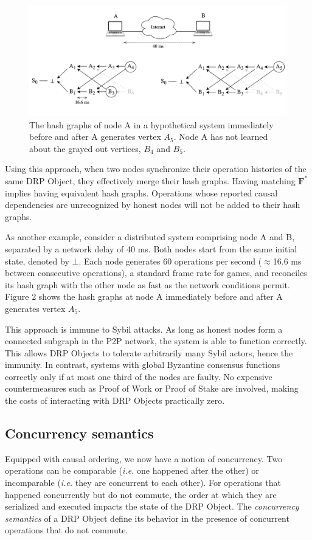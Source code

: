 \documentclass{article}
\begin{document}
\begin{figure}[htp]
    \centering
    \includegraphics[width=16cm]{fig2}
    \caption{The hash graphs of node A in a hypothetical system immediately before and after A generates vertex $A_5$. Node A has not learned about the grayed out vertices, $B_4$ and $B_5$.}
    \label{fig:2}
\end{figure}

Using this approach, when two nodes synchronize their operation histories of the same DRP Object, they effectively merge their hash graphs. Having matching $\textbf{F}^*$ implies having equivalent hash graphs. Operations whose reported causal dependencies are unrecognized by honest nodes will not be added to their hash graphs.

As another example, consider a distributed system comprising node A and B, separated by a network delay of 40 ms. Both nodes start from the same initial state, denoted by $\bot$. Each node generates 60 operations per second ($\approx$16.6 ms between consecutive operations), a standard frame rate for games, and reconciles its hash graph with the other node as fast as the network conditions permit. Figure 2 shows the hash graphs at node A immediately before and after A generates vertex $A_5$.

This approach is immune to Sybil attacks. As long as honest nodes form a connected subgraph in the P2P network, the system is able to function correctly. This allows DRP Objects to tolerate arbitrarily many Sybil actors, hence the immunity. In contrast, systems with global Byzantine consensus functions correctly only if at most one third of the nodes are faulty. No expensive countermeasures such as Proof of Work or Proof of Stake are involved, making the costs of interacting with DRP Objects practically zero.

\subsection{Concurrency semantics}
Equipped with causal ordering, we now have a notion of concurrency. Two operations can be comparable (\textit{i.e.} one happened after the other) or incomparable (\textit{i.e.} they are concurrent to each other). For operations that happened concurrently but do not commute, the order at which they are serialized and executed impacts the state of the DRP Object. The \textit{concurrency semantics} of a DRP Object define its behavior in the presence of concurrent operations that do not commute.
\end{document}
